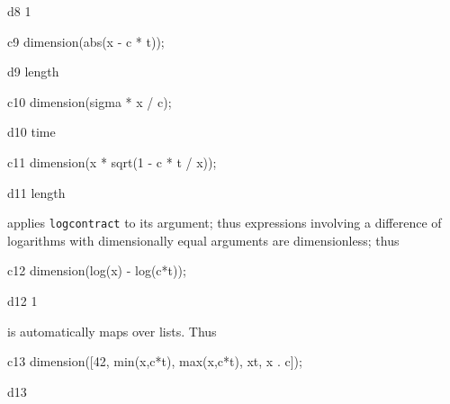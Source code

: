 \documentclass[12pt]{article}
\begin{document}
\begin{mdline}{d8}
1
\end{mdline}

\begin{mcline}{c9}
dimension(abs(x - c * t));
\end{mcline}

\begin{mdline}{d9}
length
\end{mdline}

\begin{mcline}{c10}
dimension(sigma * x / c);
\end{mcline}

\begin{mdline}{d10}
time
\end{mdline}

\begin{mcline}{c11}
dimension(x * sqrt(1 - c * t / x));
\end{mcline}

\begin{mdline}{d11}
length
\end{mdline}

\vspace{0.1in}

 applies {\tt logcontract} to its 
argument; thus expressions involving a difference of logarithms
with dimensionally equal arguments are dimensionless; thus

\vspace{0.1in}

\begin{mcline}{c12}
dimension(log(x) - log(c*t));
\end{mcline}



\begin{mdline}{d12}
1
\end{mdline}


\vspace{0.1in}

 is automatically maps over lists. Thus

\vspace{0.1in}



\begin{mcline}{c13}
dimension([42, min(x,c*t), max(x,c*t), x^^4, x . c]);
\end{mcline}



\begin{mdline}{d13}
\end{mdline}
\end{document}
